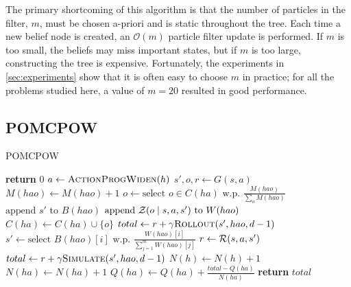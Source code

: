 The primary shortcoming of this algorithm is that the number of particles in the filter, $m$, must be chosen a-priori and is static throughout the tree.
Each time a new belief node is created, an $\mathcal{O}(m)$ particle filter update is performed.
If $m$ is too small, the beliefs may miss important states, but if $m$ is too large, constructing the tree is expensive.
Fortunately, the experiments in \cref{sec:experiments} show that it is often easy to choose $m$ in practice; for all the problems studied here, a value of $m=20$ resulted in good performance.

\subsection{POMCPOW} \label{sec:pomcpow}

\begin{algorithm}[htbp]
    \caption{POMCPOW} \label{alg:pomcpow}
    \begin{algorithmic}[1]
                \State \textbf{return} $0$
            \EndIf
            \State $a \gets \Call{ActionProgWiden}{h}$
            \State $s',o,r \gets G(s,a)$
                \State $M(hao) \gets M(hao) + 1$
            \Else
                \State $o \gets \text{select } o \in C(ha) \text{ w.p. } \frac{M(hao)}{\sum_{o} M(hao)}$
            \EndIf
            \State $\text{append } s' \text{ to } B(hao)$ \label{lin:insert}
            \State $\text{append } \mathcal{Z}(o \mid s, a, s') \text{ to } W(hao)$ \label{lin:weight}
             
                \State $C(ha) \gets C(ha) \cup \{o\}$
                \State $total \gets r + \gamma \Call{Rollout}{s', hao, d-1}$
            \Else
                \State $s' \gets \text{select } B(hao)[i] \text{ w.p. } \frac{W(hao)[i]}{\sum_{j=1}^m W(hao)[j]}$ \label{lin:sample}
                \State $r \gets \mathcal{R}(s,a,s')$
                \State $total \gets r + \gamma \Call{Simulate}{s', hao, d-1}$
            \EndIf
            \State $N(h) \gets N(h)+1$
            \State $N(ha) \gets N(ha)+1$
            \State $Q(ha) \gets Q(ha) + \frac{total - Q(ha)}{N(ha)}$
            \State \textbf{return} $total$
        \EndProcedure
    \end{algorithmic}
\end{algorithm}


